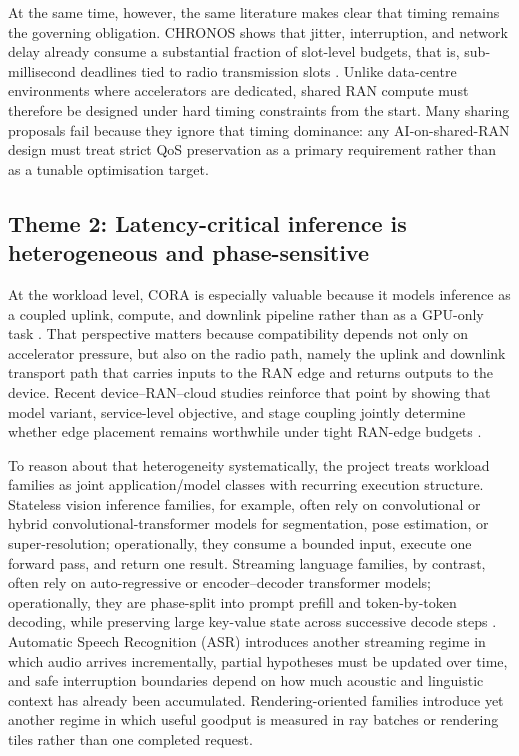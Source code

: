 \documentclass[a4paper,11pt]{article}
\begin{document}
At the same time, however, the same literature makes clear that timing remains the governing obligation. CHRONOS shows that jitter, interruption, and network delay already consume a substantial fraction of slot-level budgets, that is, sub-millisecond deadlines tied to radio transmission slots \cite{chronos}. Unlike data-centre environments where accelerators are dedicated, shared RAN compute must therefore be designed under hard timing constraints from the start. Many sharing proposals fail because they ignore that timing dominance: any AI-on-shared-RAN design must treat strict QoS preservation as a primary requirement rather than as a tunable optimisation target.

\subsection{Theme 2: Latency-critical inference is heterogeneous and phase-sensitive}

At the workload level, CORA is especially valuable because it models inference as a coupled uplink, compute, and downlink pipeline rather than as a GPU-only task \cite{cora}. That perspective matters because compatibility depends not only on accelerator pressure, but also on the radio path, namely the uplink and downlink transport path that carries inputs to the RAN edge and returns outputs to the device. Recent device--RAN--cloud studies reinforce that point by showing that model variant, service-level objective, and stage coupling jointly determine whether edge placement remains worthwhile under tight RAN-edge budgets \cite{slaairan}.

To reason about that heterogeneity systematically, the project treats workload families as joint application/model classes with recurring execution structure. Stateless vision inference families, for example, often rely on convolutional or hybrid convolutional-transformer models for segmentation, pose estimation, or super-resolution; operationally, they consume a bounded input, execute one forward pass, and return one result. Streaming language families, by contrast, often rely on auto-regressive or encoder--decoder transformer models; operationally, they are phase-split into prompt prefill and token-by-token decoding, while preserving large key-value state across successive decode steps \cite{pagedattention,distserve,orca}. Automatic Speech Recognition (ASR) introduces another streaming regime in which audio arrives incrementally, partial hypotheses must be updated over time, and safe interruption boundaries depend on how much acoustic and linguistic context has already been accumulated. Rendering-oriented families introduce yet another regime in which useful goodput is measured in ray batches or rendering tiles rather than one completed request.
\end{document}
